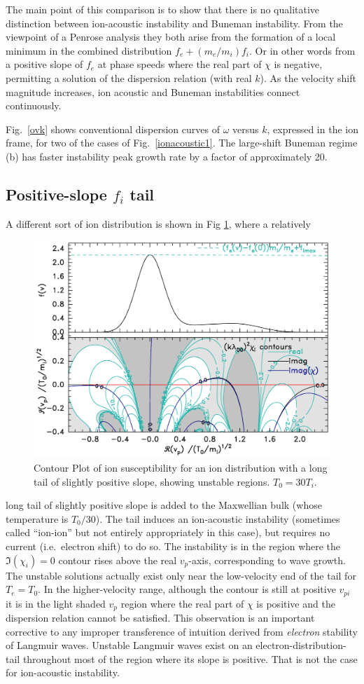 \documentclass[12pt]{article}
\begin{document}
The main point of this comparison is to show that there is no
qualitative distinction between ion-acoustic instability and Buneman
instability. From the viewpoint of a Penrose analysis they both arise
from the formation of a local minimum in the combined distribution
$f_e+(m_e/m_i)f_i$. Or in other words from a positive slope of $f_e$
at phase speeds where the real part of $\chi$ is negative, permitting
a solution of the dispersion relation (with real $k$). As the velocity
shift magnitude increases, ion acoustic and Buneman instabilities
connect continuously.

Fig.\ \ref{ovk} shows conventional dispersion curves of $\omega$
versus $k$, expressed in the ion frame, for two of the cases of Fig.\
\ref{ionacoustic1}. The large-shift Buneman regime (b) has faster
instability peak growth rate by a factor of approximately 20.


\subsection{Positive-slope $f_i$ tail}
A different sort of ion distribution is shown in Fig \ref{flattail}, where a relatively
\begin{figure}[ht]
  \center\includegraphics[width=0.8\hsize]{flattailion}\endcenter
  \caption{Contour Plot of ion susceptibility for an ion distribution with
    a long tail of slightly positive slope, showing unstable
    regions. $T_0=30T_i$. \label{flattail}}
\end{figure}
long tail of slightly positive slope is added to the Maxwellian bulk
(whose temperature is $T_0/30$). The tail induces an ion-acoustic
instability (sometimes called ``ion-ion'' but not entirely
appropriately in this case), but requires no current (i.e.\ electron
shift) to do so. The instability is in the region where the
$\Im(\chi_i)=0$ contour rises above the real $v_p$-axis, corresponding
to wave growth. The unstable solutions actually exist only near the
low-velocity end of the tail for $T_e=T_0$. In the higher-velocity
range, although the contour is still at positive $v_{pi}$ it is in the
light shaded $v_p$ region where the real part of $\chi$ is positive
and the dispersion relation cannot be satisfied. This observation is
an important corrective to any improper transference of intuition
derived from \emph{electron} stability of Langmuir waves. Unstable
Langmuir waves exist on an electron-distribution-tail throughout most
of the region where its slope is positive. That is not the case for
ion-acoustic instability.
\end{document}
